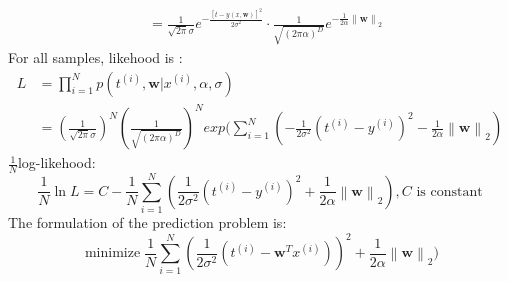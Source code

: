 \documentclass{article}
\newcommand{\norm}[2]{\left\| #1 \right\|_{#2}}
\DeclareMathOperator*{\minimize}{minimize}
\begin{document}
\begin{enumerate}[(1)]
\begin{equation}
\begin{aligned}
	&=\frac{1}{\sqrt{2\pi}\sigma}e^{-\frac{[t-y(x,\textbf{w})]^2}{2\sigma^2}}\cdot \frac{1}{\sqrt{(2\pi\alpha)^D}}e^{-\frac{1}{2\alpha}\norm{\bm{w}}2}
	\end{aligned}
	\end{equation}
	For all samples, likehood is :\\
	\begin{equation}
		\begin{aligned}
		L &= {\displaystyle \prod_{i=1}^{N}} p(t^{(i)},\bm{w}|x^{(i)},\alpha,\sigma)\\
		&=(\frac{1}{\sqrt{2\pi}\sigma})^N(\frac{1}{\sqrt{(2\pi\alpha)^D}})^N exp({\displaystyle \sum_{i=1}^{N}}(-\frac{1}{2\sigma^2}(t^{(i)}-y^{(i)})^2 - \frac{1}{2\alpha}\norm{\bm{w}}2)
		\end{aligned}
	\end{equation}
	$\frac{1}{N}$log-likehood: \\
	$$\frac{1}{N}\ln{L} = C - \frac{1}{N}{\displaystyle \sum_{i=1}^{N}}(\frac{1}{2\sigma^2}(t^{(i)}-y^{(i)})^2 + \frac{1}{2\alpha}\norm{\bm{w}}2), C \text{ is constant}$$
	The formulation of the prediction problem is:\\
	$$\displaystyle{\minimize\frac{1}{N}{\displaystyle \sum_{i=1}^{N}}(\frac{1}{2\sigma^2}(t^{(i)}-\bm{w}^Tx^{(i)}))^2 + \frac{1}{2\alpha}\norm{\bm{w}}2)}$$
\end{enumerate}
\end{document}
